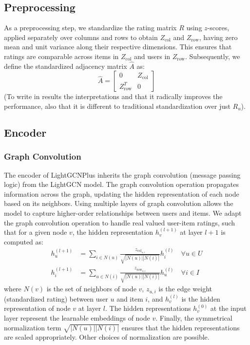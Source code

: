 \documentclass[10pt,conference,compsocconf]{IEEEtran}
\begin{document}
\subsection{Preprocessing}
As a preprocessing step, we standardize the rating matrix $R$ using $z$-scores, applied separately over columns and rows to obtain $Z_{\text{col}}$ and $Z_{\text{row}}$, 
having zero mean and unit variance along their respective dimensions.
This ensures that ratings are comparable across items in $Z_{\text{col}}$ and users in $Z_{\text{row}}$.
Subsequently, we define the standardized adjacency matrix $\hat{A}$ as:
\[
\hat{A} = \begin{bmatrix}
0 & Z_{\text{col}} \\
Z_{\text{row}}^T & 0
\end{bmatrix}
\]
(To write in results the interpretations and that it radically improves the performance, also that it is different to traditional standardization over just $R_u$).

\subsection{Encoder}
\subsubsection{Graph Convolution}
The encoder of LightGCNPlus inherits the graph convolution (message passing logic) from the LightGCN model.
The graph convolution operation propagates information across the graph, updating the hidden representation of each node based on its neighbors.
Using multiple layers of graph convolution allows the model to capture higher-order relationships between users and items.
We adapt the graph convolution operation to handle real valued user-item ratings, such that
for a given node $v$, the hidden representation $h_v^{(l+1)}$ at layer $l+1$ is computed as:
\begin{align}
    h_u^{(l+1)} &= \sum_{i \in N(u)} \frac{z_{\text{col}_{u,i}}}{\sqrt{|N(u)||N(i)|}} h_i^{(l)} \quad \forall u \in U \\
    h_i^{(l+1)} &= \sum_{u \in N(i)} \frac{z_{\text{row}_{u,i}}}{\sqrt{|N(u)||N(i)|}} h_u^{(l)}  \quad \forall i \in I
\end{align}
where $N(v)$ is the set of neighbors of node $v$, $z_{u,i}$ is the edge weight (standardized rating) between user $u$ and item $i$, and $h_v^{(l)}$ is the hidden representation of node $v$ at layer $l$.
The hidden representations $h_v^{(0)}$ at the input layer represent the learnable embeddings of node $v$. Finally, the symmetrical normalization term $\sqrt{|N(u)||N(i)|}$ ensures that the hidden representations are scaled appropriately. Other choices of normalization are possible.
\end{document}
